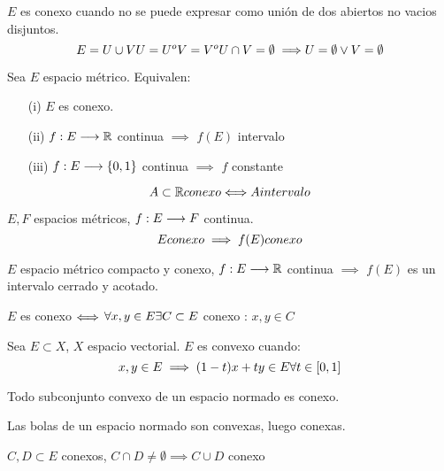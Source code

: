 \begin{definicion}
    $E$ es conexo cuando no se puede expresar como unión de dos abiertos no vacios disjuntos.
    $$E=U\cup V \\ U = U^o \\ V=V^o \\ U\cap V = \emptyset \\\implies\\ U=\emptyset \\\lor \\ V=\emptyset$$
\end{definicion}

\begin{prop}[Caracterización]
    Sea $E$ espacio métrico. Equivalen:
    \begin{itemize}
        \item[(i)] $E$ es conexo.
        \item[(ii)] $f:E \longrightarrow \mathbb R$ continua $\implies$ $f(E)$ intervalo
        \item[(iii)] $f:E \longrightarrow \{0,1\}$ continua $\implies$ $f$ constante
    \end{itemize}
\end{prop}

\begin{prop}
    $$A\subset \mathbb R \\ conexo \\\Longleftrightarrow\\ A \\ intervalo$$
\end{prop}

\begin{teo}
    $E,F$ espacios métricos, $f:E \longrightarrow F$ continua.
    $$E \\ conexo \implies f(E) \\ conexo$$
\end{teo}

\begin{coro}
    $E$ espacio métrico compacto y conexo, $f:E\longrightarrow\mathbb R$ continua $\implies$ $f(E)$ es un intervalo cerrado y acotado.
\end{coro}

\begin{prop}
    $E$ es conexo $\Longleftrightarrow$ $\forall x,y \in E\\ \exists C \subset E$ conexo : $x,y \in C$ 
\end{prop}

\begin{definicion}
    Sea $E\subset X$, $X$ espacio vectorial. $E$ es convexo cuando: 
    $$x,y \in E \implies (1-t)x+ty \in E \\ \forall t \in [0,1]$$
\end{definicion}

\begin{ejemplo}
    Todo subconjunto convexo de un espacio normado es conexo.
\end{ejemplo}

\begin{ejemplo}
    Las bolas de un espacio normado son convexas, luego conexas.
\end{ejemplo}

\begin{ejemplo}
    $C,D \subset E$ conexos, $C\cap D \neq \emptyset \implies C\cup D$ conexo
\end{ejemplo}